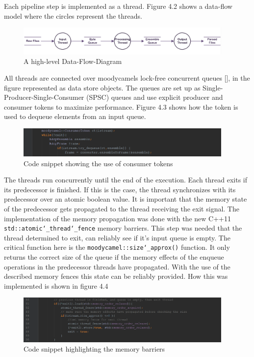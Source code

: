 Each pipeline step is implemented as a thread. Figure 4.2 shows a data-flow model where the circles represent the threads. 

\begin{figure}[h]
\centering
      \includegraphics[width=0.95\textwidth]{dfd}
        \caption{A high-level Data-Flow-Diagram }
\end{figure}

 All threads are connected over moodycamels lock-free concurrent queues [], in the figure represented as data store objects. The queues are set up as Single-Producer-Single-Consumer (SPSC) queues and use explicit producer and consumer tokens to maximize performance. Figure 4.3 shows how the token is used to dequeue elements from an input queue.

\begin{figure}[h]	
\centering
      \includegraphics[width=0.95\textwidth]{ct}
        \caption{Code snippet showing the use of consumer tokens}
\end{figure}

The threads run concurrently until the end of the execution. Each thread exits if its predecessor is finished. If this is the case, the thread synchronizes with its predecessor over an atomic boolean value. It is important that the memory state of the predecessor gets propagated to the thread receiving the exit signal. The implementation of the memory propagation was done with the new C++11 \texttt{std::atomic\char`_thread\char`_fence} memory barriers. This step was needed that the thread determined to exit, can reliably see if it's input queue is empty. The critical function here is the \texttt{moodycamel::size\char`_approx()} function. It only returns the correct size of the queue if the memory effects of the enqueue operations in the predecessor threads have propagated. With the use of the described memory fences this state can be reliably provided. How this was implemented is shown in figure 4.4

\begin{figure}[h]
\centering
      \includegraphics[width=0.95\textwidth]{memory_barrier}
        \caption{Code snippet highlighting the memory barriers}
\end{figure}

